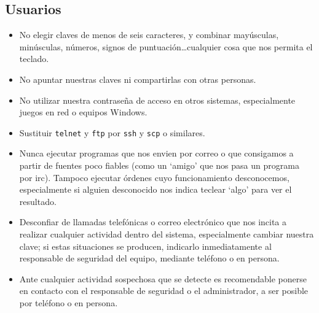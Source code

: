 \subsection{Usuarios}
\begin{itemize}
\item No elegir claves de menos de seis caracteres, y combinar may\'usculas,
min\'usculas, n\'umeros, signos de puntuaci\'on\ldots cualquier cosa que nos 
permita el teclado.
\item No apuntar nuestras claves ni compartirlas con otras personas.
\item No utilizar nuestra contrase\~na de acceso en otros sistemas, 
especialmente juegos en red o equipos Windows.
\item Sustituir {\tt telnet} y {\tt ftp} por {\tt ssh} y {\tt scp} o similares.
\item Nunca ejecutar programas que nos envien por correo o que consigamos a 
partir de fuentes poco fiables (como un `amigo' que nos pasa un programa por
{\sc irc}). Tampoco ejecutar \'ordenes cuyo funcionamiento desconocemos, 
especialmente si alguien desconocido nos indica teclear `algo' para ver el
resultado.
\item Desconfiar de llamadas telef\'onicas o correo electr\'onico que nos incita
a realizar cualquier actividad dentro del sistema, especialmente cambiar nuestra
clave; si estas situaciones se producen, indicarlo inmediatamente al responsable
de seguridad del equipo, mediante tel\'efono o en persona.
\item Ante cualquier actividad sospechosa que se detecte es recomendable 
ponerse en contacto con el responsable de seguridad o el administrador, a ser 
posible por tel\'efono o en persona.
\end{itemize}
%
